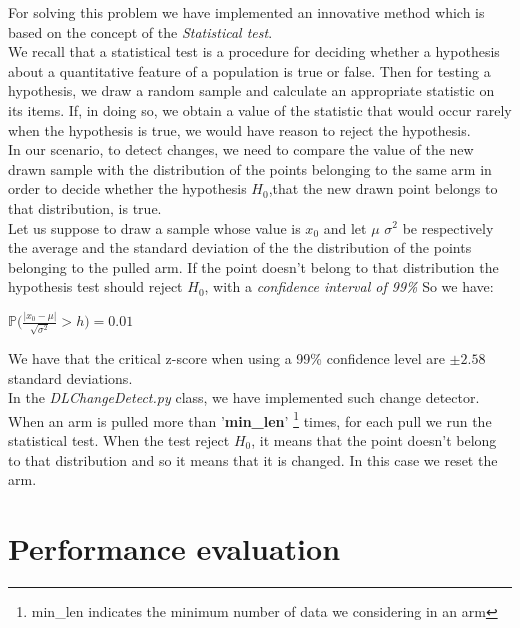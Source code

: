 For solving this problem we have implemented an innovative method which is based on the concept of the \textit{Statistical test}.\\
We recall that a statistical test is a procedure for deciding whether a hypothesis about a quantitative feature of a population is true or false. Then for testing a hypothesis, we draw a random sample and calculate an appropriate statistic on its items. If, in doing so, we obtain a value of the statistic that would occur rarely when the hypothesis is true, we would have reason to reject the hypothesis.\\
In our scenario, to detect changes, we need to compare the value of the new drawn sample with the distribution of the points belonging to the same arm in order to decide whether the hypothesis $H_0$,that the new drawn point belongs to that distribution, is true.\\
Let us suppose to draw a sample whose value is $x_0$ and let $\mu$ $\sigma^2$ be respectively the average
and the standard deviation of the the distribution of the points belonging to the pulled arm. 
If the point doesn't belong to that distribution the hypothesis test should reject $H_0$, with a \textit{confidence interval of 99\%} So we have:

\begin{center}
		
	 $\mathbb{P}\Big(\frac{|x_0 - \mu|}{\sqrt{\sigma^2}} > h \Big) = 0.01 $
\end{center}

We have that the critical z-score when using a 99\% confidence level are $\pm 2.58$ standard deviations.\\

In the \textit{DLChangeDetect.py} class, we have implemented such change detector. When an arm is pulled more than '\textbf{min\_len}' \footnote{min\_len indicates the minimum number of data we considering in an arm} times, for each pull we run the statistical test. When the test reject $H_0$, it means that the point doesn't belong to that distribution and so it means that it is changed. In this case we reset the arm.\\ 

\section{Performance evaluation}

